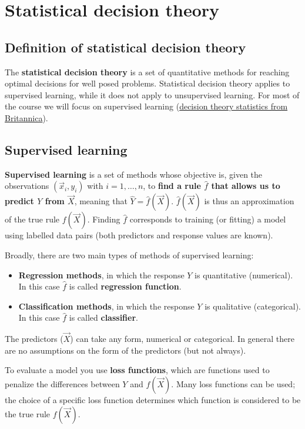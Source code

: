 \graphicspath{{chapters/images/0202/}}

\chapter{Statistical decision theory}
  
  \section{Definition of statistical decision theory}
    The \textbf{statistical decision theory} is a set of quantitative methods for reaching optimal decisions for well posed problems. Statistical decision theory applies to supervised learning, while it does not apply to unsupervised learning. For most of the course we will focus on supervised learning (\href{https://www.britannica.com/science/decision-theory-statistics}{decision theory statistics from Britannica}). 

  \section{Supervised learning}
    \textbf{Supervised learning} is a set of methods whose objective is, given the observations $(\vec{x}_i, y_i)$ with $i = 1, \dots, n$, to \textbf{find a rule $\hat{f}$ that allows us to predict $Y$ from $\vec{X}$}, meaning that $\hat{Y} = \hat{f}(\vec{X})$. $\hat{f}(\vec{X})$ is thus an approximation of the true rule $f(\vec{X})$. Finding $\hat{f}$ corresponds to training (or fitting) a model using labelled data pairs (both predictors and response values are known).

    Broadly, there are two main types of methods of supervised learning: 
    \begin{itemize}
      \item \textbf{Regression methods}, in which the response $Y$ is quantitative (numerical). In this case $\hat{f}$ is called \textbf{regression function}.
      \item \textbf{Classification methods}, in which the response $Y$ is qualitative (categorical). In this case $\hat{f}$ is called \textbf{classifier}.
    \end{itemize}
    
    The predictors ($\vec{X}$) can take any form, numerical or categorical. In general there are no assumptions on the form of the predictors (but not always).
    
    To evaluate a model you use \textbf{loss functions}, which are functions used to penalize the differences between $Y$ and $f(\vec{X})$. Many loss functions can be used; the choice of a specific loss function determines which function is considered to be the true rule $f(\vec{X})$.

